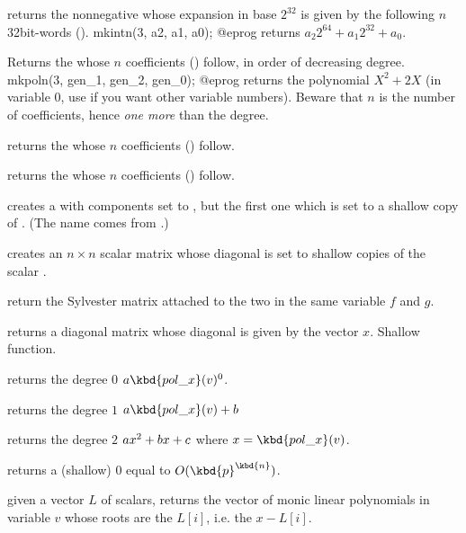 \smallskip

 returns the nonnegative  whose
expansion in base $2^{32}$ is given by the following $n$ 32bit-words
().
\bprog
  mkintn(3, a2, a1, a0);
@eprog
\noindent returns $a_2 2^{64} + a_1 2^{32} + a_0$.

 Returns the  whose $n$
coefficients () follow, in order of decreasing degree.
\bprog
  mkpoln(3, gen_1, gen_2, gen_0);
@eprog
\noindent returns the polynomial $X^2 + 2X$ (in variable $0$, use
 if you want other variable numbers). Beware that $n$ is the
number of coefficients, hence \emph{one more} than the degree.

 returns the  whose $n$
coefficients () follow.

 returns the  whose $n$
coefficients () follow.

 creates a  with 
components set to , but the first one which is set to a shallow
copy of . (The name comes from .)

 creates an $n\times n$
scalar matrix whose diagonal is set to shallow copies of the scalar .

 return the Sylvester matrix
attached to the two  in the same variable $f$ and $g$.

 returns a diagonal matrix whose diagonal
is given by the vector $x$. Shallow function.

 returns the degree $0$
 $a \kbd{pol\_x}(v)^0$.

 returns the degree $1$
 $a\kbd{pol\_x}(v) + b$

 returns the degree $2$
 $a\*x^2+b\*x+c$ where $x=\kbd{pol\_x}(v)$.

 returns a (shallow) $0$
 equal to $O(\kbd{p}^\kbd{n})$.


 given a vector $L$ of scalars,
returns the vector of monic linear polynomials in variable $v$ whose roots
are the $L[i]$, i.e. the $x - L[i]$.

